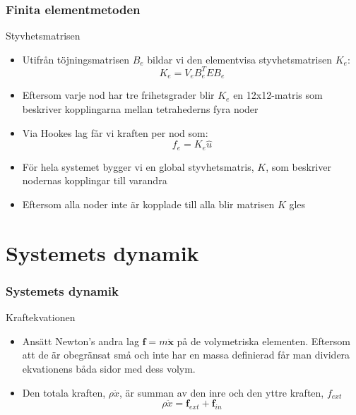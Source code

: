 \documentclass{beamer}
\begin{document}
\begin{frame}
\frametitle{Finita elementmetoden}
\begin{block}{Styvhetsmatrisen}
\begin{itemize}
\item Utifrån töjningsmatrisen $B_e$ bildar vi den elementvisa styvhetsmatrisen $K_e$:
	\begin{equation}\label{eqn:stiffnessmatrix}
    	K_{e} = V_{e} B_ {e}^{T}EB_ {e}
	\end{equation}
\item Eftersom varje nod har tre frihetsgrader blir $K_e$ en 12x12-matris som beskriver kopplingarna mellan tetrahederns fyra noder
\item Via Hookes lag får vi kraften per nod som:
	\begin{equation}\label{eqn:stiffnessmatrix}
    	f_{e} = K_ {e}\hat{u}
	\end{equation}
\item För hela systemet bygger vi en global styvhetsmatris, $K$, som beskriver nodernas kopplingar till varandra
\item Eftersom alla noder inte är kopplade till alla blir matrisen $K$ gles
\end{itemize}

\end{block}
\end{frame}


\section{Systemets dynamik}
\begin{frame}
\frametitle{Systemets dynamik}
\begin{block}{Kraftekvationen}
\begin{itemize}
\item Ansätt Newton's andra lag $\mathbf{f} = m\ddot{\mathbf{x}}$ på de volymetriska elementen. Eftersom att de är obegränsat små och inte har en massa definierad får man dividera ekvationens båda sidor med dess volym.
\item Den totala kraften, $\rho \ddot{x}$, är summan av den inre och den yttre kraften, $f_{ext}$
	\begin{equation}
		\rho \ddot{x} = \mathbf{f}_{ext} + \mathbf{f}_{in}
	\end{equation}
		
\end{itemize}	
\end{block}
\end{frame}
\end{document}
